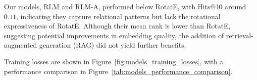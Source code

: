 Our models, RLM and RLM-A, performed below RotatE, with Hits@10 around $0.11$, indicating they capture relational patterns but lack the rotational expressiveness of RotatE.
Although their mean rank is lower than RotatE, suggesting potential improvements in embedding quality, the addition of retrieval-augmented generation (RAG) did not yield further benefits.

Training losses are shown in Figure~\ref{fig:models_training_losses}, with a performance comparison in Figure~\ref{tab:models_performance_comparison}.




%
%
%


